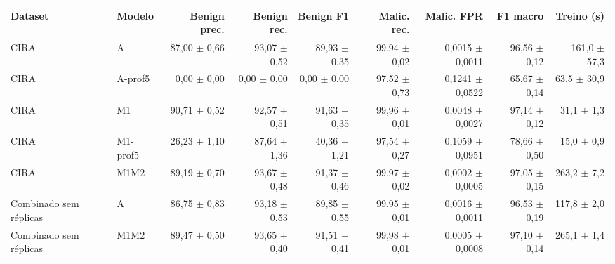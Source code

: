 \begin{tabular}{llrrrrrrr}
\hline
\textbf{Dataset} & \textbf{Modelo} & \textbf{Benign prec.} & \textbf{Benign rec.} & \textbf{Benign F1} & \textbf{Malic. rec.} & \textbf{Malic. FPR} & \textbf{F1 macro} & \textbf{Treino (s)} \\ \hline
CIRA & A & 87,00 $\pm$ 0,66 & 93,07 $\pm$ 0,52 & 89,93 $\pm$ 0,35 & 99,94 $\pm$ 0,02 & 0,0015 $\pm$ 0,0011 & 96,56 $\pm$ 0,12 & 161,0 $\pm$ 57,3 \\
CIRA & A-prof5 & 0,00 $\pm$ 0,00 & 0,00 $\pm$ 0,00 & 0,00 $\pm$ 0,00 & 97,52 $\pm$ 0,73 & 0,1241 $\pm$ 0,0522 & 65,67 $\pm$ 0,14 & 63,5 $\pm$ 30,9 \\
CIRA & M1 & 90,71 $\pm$ 0,52 & 92,57 $\pm$ 0,51 & 91,63 $\pm$ 0,35 & 99,96 $\pm$ 0,01 & 0,0048 $\pm$ 0,0027 & 97,14 $\pm$ 0,12 & 31,1 $\pm$ 1,3 \\
CIRA & M1-prof5 & 26,23 $\pm$ 1,10 & 87,64 $\pm$ 1,36 & 40,36 $\pm$ 1,21 & 97,54 $\pm$ 0,27 & 0,1059 $\pm$ 0,0951 & 78,66 $\pm$ 0,50 & 15,0 $\pm$ 0,9 \\
CIRA & M1M2 & 89,19 $\pm$ 0,70 & 93,67 $\pm$ 0,48 & 91,37 $\pm$ 0,46 & 99,97 $\pm$ 0,02 & 0,0002 $\pm$ 0,0005 & 97,05 $\pm$ 0,15 & 263,2 $\pm$ 7,2 \\
\hline
Combinado sem réplicas & A & 86,75 $\pm$ 0,83 & 93,18 $\pm$ 0,53 & 89,85 $\pm$ 0,55 & 99,95 $\pm$ 0,01 & 0,0016 $\pm$ 0,0011 & 96,53 $\pm$ 0,19 & 117,8 $\pm$ 2,0 \\
Combinado sem réplicas & M1M2 & 89,47 $\pm$ 0,50 & 93,65 $\pm$ 0,40 & 91,51 $\pm$ 0,41 & 99,98 $\pm$ 0,01 & 0,0005 $\pm$ 0,0008 & 97,10 $\pm$ 0,14 & 265,1 $\pm$ 1,4 \\
\hline
\end{tabular}
